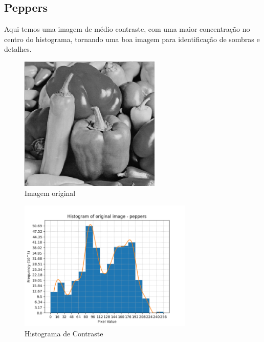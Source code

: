 \documentclass[12pt, letterpaper]{article}
\begin{document}
    \subsection{Peppers}
        Aqui temos uma imagem de médio contraste, com uma maior concentração no centro do histograma, tornando uma boa imagem para identificação de sombras e detalhes.
        \begin{figure}[H]
            \label{hist:peppers}
            \centering
            \includegraphics[width=0.6\textwidth]{peppers.png}
            \\{Imagem original}

            \includegraphics[width=0.74\textwidth]{peppers_histogram.png}
            \\{Histograma de Contraste}
        \end{figure}
\end{document}
